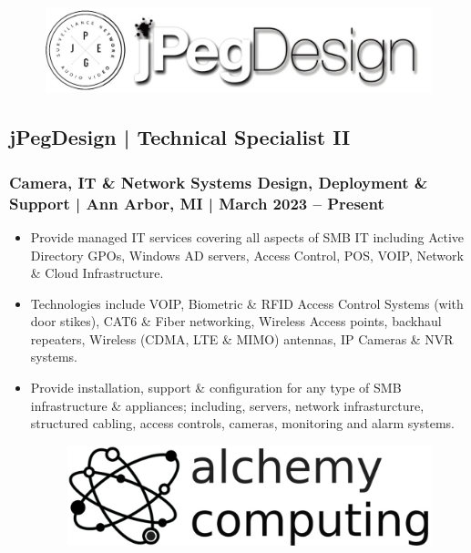 \documentclass[letter,10pt]{article}
\begin{document}
\begin{figure}
\includegraphics[width=0.8\linewidth]{./img/jpeg_banner.jpg}
\end{figure}

\subsection*{jPegDesign | Technical Specialist II}
\label{sec:orgbd78fdb}
\subsubsection*{Camera, IT \& Network Systems Design, Deployment \& Support | Ann Arbor, MI | March 2023 – Present}
\label{sec:org15c13ac}
\begin{itemize}
\item Provide managed IT services covering all aspects of SMB IT including Active Directory GPOs, Windows AD servers, Access Control, POS, VOIP, Network \& Cloud Infrastructure.
\label{sec:orgbeddcaa}
\item Technologies include VOIP, Biometric \& RFID Access Control Systems (with door stikes), CAT6 \& Fiber networking, Wireless Access points, backhaul repeaters, Wireless (CDMA, LTE \& MIMO) antennas, IP Cameras \& NVR systems.
\label{sec:org8cc6734}
\item Provide installation, support \& configuration for any type of SMB infrastructure \& appliances; including, servers, network infrasturcture, structured cabling, access controls, cameras, monitoring and alarm systems.
\label{sec:org0150d92}




\begin{figure}
\includegraphics[width=0.8\linewidth]{./img/50p_alchemy_computing.jpg}
\end{figure}
\end{itemize}
\end{document}
